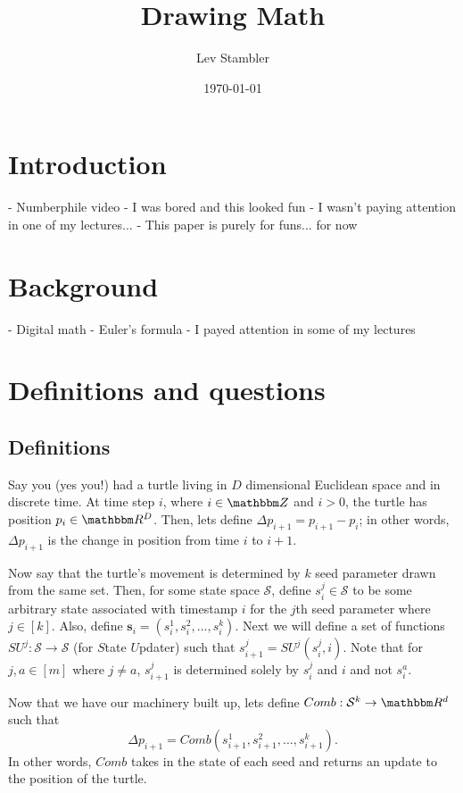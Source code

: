 \documentclass[11pt,titlepage]{article}
\newcommand{\myname}{Lev Stambler}
\newcommand{\combWithState}[1]{Comb\left(s^1_{#1}, s^2_{#1}, ..., s^k_{#1}\right)}
\begin{document}
\title{Drawing Math}

\author{\myname}

\date{\today}

\maketitle

\pagebreak
\section{Introduction}
- Numberphile video
- I was bored and this looked fun
- I wasn't paying attention in one of my lectures...
- This paper is purely for funs... for now

\section{Background}
- Digital math
- Euler's formula
- I payed attention in some of my lectures

\section{Definitions and questions}
\subsection{Definitions}
Say you (yes you!) had a turtle living in $D$ dimensional Euclidean
space and in discrete time. At time step $i$, where $i \in \Z$ and $i > 0$,
the turtle has position $p_i \in \R^D$.
Then, lets define $\Delta p_{i+1} = p_{i+1} - p_i$; in other words, $\Delta p_{i+1}$ is the change in position from time $i$ to $i + 1$.

Now say that the turtle's movement is determined by $k$ seed parameter drawn from
the same set. Then, for some state space $\mathcal{S}$,
define $s_i^j \in \mathcal{S}$ to be some arbitrary
state associated with timestamp $i$ for the $j$th seed parameter where $j \in [k]$.
Also, define $\pmb{s}_i = (s_i^1, s_i^2, ..., s_i^k)$.
Next we will define a set of functions $SU^j: \mathcal{S} \rightarrow \mathcal{S}$
(for $S$tate $U$pdater) such that $s_{i + 1}^j = SU^j(s_i^j, i)$. Note that for
$j, a \in [m]$ where $j \neq a$, $s_{i+1}^j$ is determined solely by $s_i^j$ and $i$ and not
$s_i^a$.

Now that we have our machinery built up, lets define $Comb: \mathcal{S}^k \rightarrow \R^d$ such that
$$
  \Delta p_{i + 1} = \combWithState{i + 1}.
$$
In other words, $Comb$ takes in the state of each seed and
returns an update to the position of the turtle.
\end{document}
